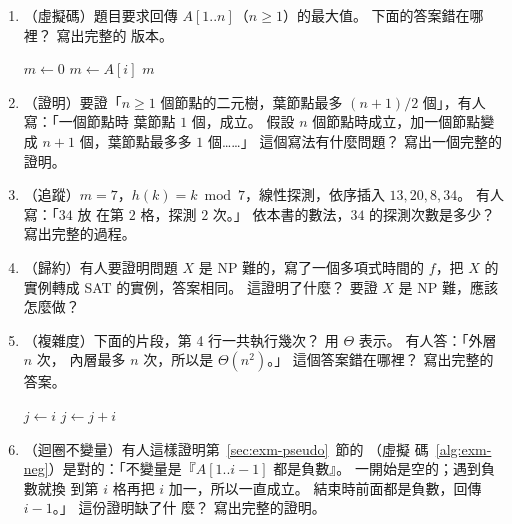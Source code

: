 \begin{enumerate}
\item （虛擬碼）題目要求回傳 $A[1..n]$（$n \ge 1$）的最大值。 下面的答案錯在哪裡？ 寫出完整的
版本。
\begin{center}
\begin{minipage}{0.6\linewidth}
\begin{algorithmic}[1]
    \State $m \gets 0$
            \State $m \gets A[i]$
        \EndIf
    \EndFor
    \State \Return $m$
\EndFunction
\end{algorithmic}
\end{minipage}
\end{center}
\label{q:exm-max}

\item （證明）要證「$n \ge 1$ 個節點的二元樹，葉節點最多 $(n + 1)/2$ 個」，有人寫：「一個節點時
葉節點 $1$ 個，成立。 假設 $n$ 個節點時成立，加一個節點變成 $n + 1$ 個，葉節點最多多 $1$ 個……」
這個寫法有什麼問題？ 寫出一個完整的證明。

\item （追蹤）$m = 7$，$h(k) = k \bmod 7$，線性探測，依序插入 $13, 20, 8, 34$。 有人寫：「$34$ 放
在第 $2$ 格，探測 $2$ 次。」 依本書的數法，$34$ 的探測次數是多少？ 寫出完整的過程。

\item （歸約）有人要證明問題 $X$ 是 NP 難的，寫了一個多項式時間的 $f$，把 $X$ 的實例轉成
\textsf{SAT} 的實例，答案相同。 這證明了什麼？ 要證 $X$ 是 NP 難，應該怎麼做？

\item （複雜度）下面的片段，第 4 行一共執行幾次？ 用 $\Theta$ 表示。 有人答：「外層 $n$ 次，
內層最多 $n$ 次，所以是 $\Theta(n^2)$。」 這個答案錯在哪裡？ 寫出完整的答案。
\begin{center}
\begin{minipage}{0.55\linewidth}
\begin{algorithmic}[1]
    \State $j \gets i$
        \State $j \gets j + i$
    \EndWhile
\EndFor
\end{algorithmic}
\end{minipage}
\end{center}
\label{q:exm-harmonic}

\item （迴圈不變量）有人這樣證明第~\ref{sec:exm-pseudo}~節的 （虛擬
碼~\ref{alg:exm-neg}）是對的：「不變量是『$A[1..i-1]$ 都是負數』。 一開始是空的；遇到負數就換
到第 $i$ 格再把 $i$ 加一，所以一直成立。 結束時前面都是負數，回傳 $i - 1$。」 這份證明缺了什
麼？ 寫出完整的證明。
\label{q:exm-neg-proof}
\end{enumerate}

